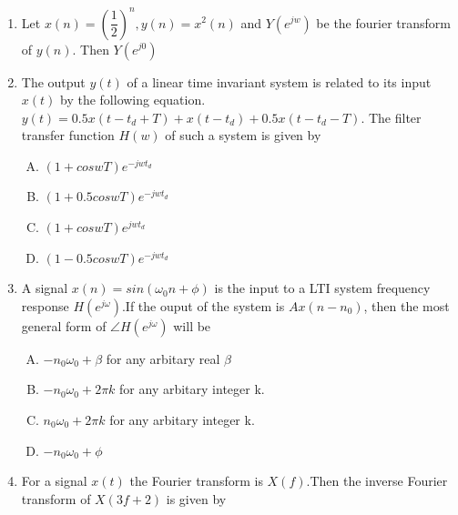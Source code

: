 \documentclass[journal,12pt,twocolumn]{IEEEtran}
\begin{document}
\begin{enumerate}
\item Let  $x(n)=(\dfrac{1}{2})^{n}, y(n)= x^{2}(n)$ and $Y(e^{jw})$ be the fourier transform of $y(n)$. Then $Y(e^{j0})$
\begin{enumerate}[(A)]
\end{enumerate}

\item The output $y(t)$ of a linear time invariant system is related to its input $x(t)$ by the following equation. $y(t)=0.5x(t-t_d+T)+x(t-t_d)+0.5x(t-t_d-T)$. The filter transfer function $H(w)$ of such a system is given by

\begin{enumerate}[(A)]

\setlength\itemsep{2em}

\item $
(1+coswT)e^{-jwt_d}
$
\item $
(1+0.5coswT)e^{-jwt_d}
$
\item $
(1+coswT)e^{jwt_d}
$
\item $
(1-0.5coswT)e^{-jwt_d}
$

\end{enumerate}

\item A signal $x(n)=sin(\omega_0n+\phi)$ is the input to a LTI system frequency response $H(e^{j\omega})$.If the ouput of the system is $Ax(n-n_0)$, then the most general form of $\angle H(e^{j\omega})$ will be

\begin{enumerate}[(A)]

\setlength\itemsep{2em}

\item $
-n_0\omega_0 + \beta 
$ for any arbitary real $\beta$
\item  $
- n_0\omega_0 + 2\pi k
$ for any arbitary integer k.
\item  $
n_0\omega_0 + 2\pi k
$ for any arbitary integer k.
\item $
- n_0\omega_0 + \phi
$

\end{enumerate}

\item For a signal $x(t)$ the Fourier transform is $X(f)$.Then the inverse Fourier transform of $X(3f+2)$ is given by
\begin{enumerate}[(A)]


\end{enumerate}
\end{enumerate}
\end{document}
